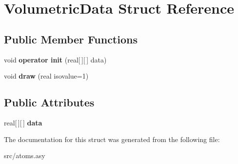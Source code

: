 \hypertarget{structVolumetricData}{\section{Volumetric\+Data Struct Reference}
\label{structVolumetricData}
}
\subsection*{Public Member Functions}
\begin{DoxyCompactItemize}
\item 
\hypertarget{structVolumetricData_aa5e59e0d52218f94d14e59cbd24ffc01}{void {\bfseries operator init} (real\mbox{[}$\,$\mbox{]}\mbox{[}$\,$\mbox{]} data)}\label{structVolumetricData_aa5e59e0d52218f94d14e59cbd24ffc01}

\item 
\hypertarget{structVolumetricData_ad0d8d7b019c93109b541120ddf4a110a}{void {\bfseries draw} (real isovalue=1)}\label{structVolumetricData_ad0d8d7b019c93109b541120ddf4a110a}

\end{DoxyCompactItemize}
\subsection*{Public Attributes}
\begin{DoxyCompactItemize}
\item 
\hypertarget{structVolumetricData_a3399d0e111f58fdca68a53d6d46a0073}{real\mbox{[}$\,$\mbox{]}\mbox{[}$\,$\mbox{]} {\bfseries data}}\label{structVolumetricData_a3399d0e111f58fdca68a53d6d46a0073}

\end{DoxyCompactItemize}


The documentation for this struct was generated from the following file\+:\begin{DoxyCompactItemize}
\item 
src/atoms.\+asy\end{DoxyCompactItemize}
